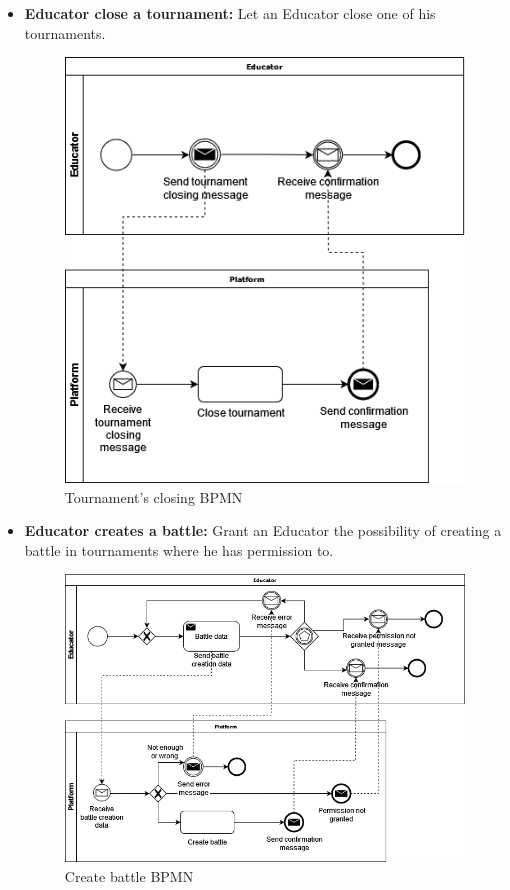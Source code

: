 \documentclass{article}
\begin{document}
{\begin{itemize}
    \item \textbf{Educator close a tournament:} Let an Educator close one of his tournaments.
          \begin{figure}[H]
              \centering
              \includegraphics[scale=0.4]{images/BPMN/BPMN9.png}
              \caption{Tournament's closing BPMN}
              \label{fig:TournamentClosingBPMN}
          \end{figure}

    \item \textbf{Educator creates a battle:} Grant an Educator the possibility of creating a battle in tournaments where he has permission to.
          \begin{figure}[H]
              \centering
              \includegraphics[scale=0.4]{images/BPMN/BPMN11.png}
              \caption{Create battle BPMN}
              \label{fig:createBattleBPMN}
          \end{figure}


\end{itemize}}
\end{document}

